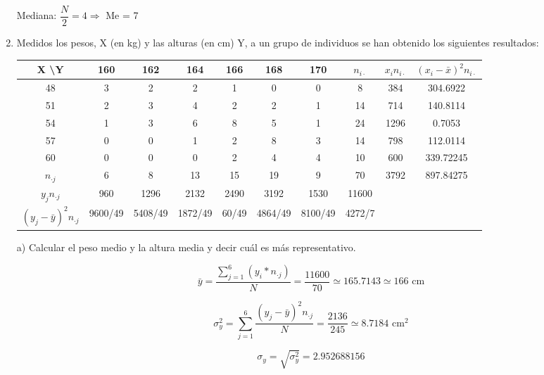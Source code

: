 \documentclass[10pt,a4paper]{article}
\begin{document}
\begin{enumerate}
\vspace{0.25cm}
Mediana: $\dfrac{N}{2} = 4 \Rightarrow $ Me = 7

\newpage
\item Medidos los pesos, X (en kg) y las alturas (en cm) Y, a un grupo de individuos se han obtenido los siguientes resultados:

\vspace{0.5cm}
\begin{tabular}{|c|c|c|c|c|c|c|c|c|c|}
\hline 
X \textbackslash Y & 160 & 162 & 164 & 166 & 168 & 170 & $n_{i\cdot}$ & $x_in_{i\cdot}$ & $(x_i - \bar{x})^2 n_{i\cdot}$ \\ 
\hline 
48 & 3 & 2 & 2 & 1 & 0 & 0 & 8 & 384 & 304.6922 \\ 
\hline 
51 & 2 & 3 & 4 & 2 & 2 & 1 & 14 & 714 & 140.8114 \\ 
\hline 
54 & 1 & 3 & 6 & 8 & 5 & 1 & 24 & 1296 & 0.7053 \\ 
\hline 
57 & 0 & 0 & 1 & 2 & 8 & 3 & 14 & 798 & 112.0114 \\ 
\hline 
60 & 0 & 0 & 0 & 2 & 4 & 4 & 10 & 600 & 339.72245 \\ 
\hline 
$n_{\cdot j}$ & 6 & 8 & 13 & 15 & 19 & 9 & 70 & 3792 & 897.84275 \\ 
\hline 
$y_jn_{\cdot j}$ & 960 & 1296 & 2132 & 2490 & 3192 & 1530 & 11600 &   &   \\ 
\hline 
$(y_j - \bar{y})^2 n_{\cdot j}$ & 9600/49 & 5408/49 & 1872/49 & 60/49 & 4864/49 & 8100/49 & 4272/7 &   &   \\ 
\hline 
\end{tabular}

\vspace{0.5cm}
\hspace{0.25cm} a) Calcular el peso medio y la altura media y decir cuál es más representativo.

\begin{equation*}
\bar{y} = \dfrac{\displaystyle\sum_{j = 1}^6(y_{i}*n_{\cdot j})}{N} = \frac{11600}{70} \simeq 165.7143 \simeq 166 \textrm{ cm}
\end{equation*}

\begin{equation*}
\sigma_y^2 = \displaystyle\sum_{j = 1}^6 \dfrac{(y_j - \bar{y})^2 n_{\cdot j}}{N} = \dfrac{2136}{245} \simeq 8.7184 \textrm{ cm}^2
\end{equation*}

\begin{equation*}
\sigma_y = \sqrt{\sigma_y^2} = 2.952688156
\end{equation*}


\end{enumerate}
\end{document}
